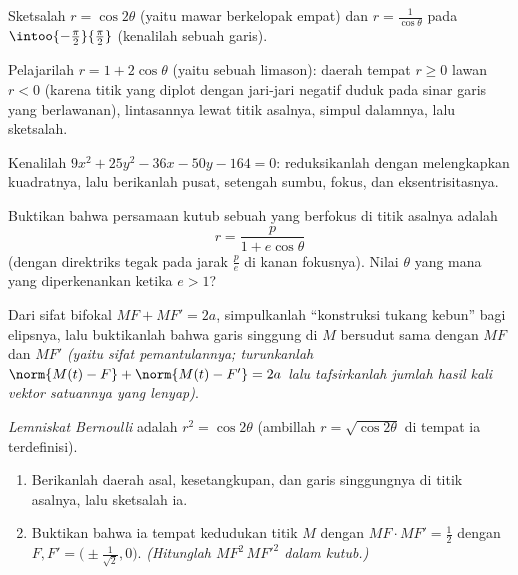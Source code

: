 \begin{exercise}[$\star$]\label{exo:b1:curves:4}
Sketsalah  $r = \cos 2\theta$ (yaitu mawar berkelopak empat) dan
$r = \frac{1}{\cos\theta}$ pada $\intoo{-\frac\pi2}{\frac\pi2}$
(kenalilah sebuah garis).
\end{exercise}

\begin{exercise}[$\star\star$]\label{exo:b1:curves:5}
Pelajarilah  $r = 1 + 2\cos\theta$ (yaitu sebuah limason): daerah
tempat $r \geq 0$ lawan $r < 0$ (karena titik yang diplot dengan jari-jari negatif
duduk pada sinar garis yang berlawanan), lintasannya lewat titik asalnya, simpul dalamnya,
lalu sketsalah.
\end{exercise}

\begin{exercise}[$\star\star$]\label{exo:b1:curves:6}
Kenalilah  $9x^2 + 25y^2 - 36x - 50y - 164 = 0$: reduksikanlah dengan
melengkapkan kuadratnya, lalu berikanlah pusat, setengah sumbu, fokus, dan eksentrisitasnya.
\end{exercise}

\begin{exercise}[$\star\star$]\label{exo:b1:curves:7}
Buktikan bahwa persamaan kutub sebuah  yang berfokus di titik asalnya
adalah
\[
r = \frac{p}{1 + e\cos\theta}
\]
(dengan direktriks tegak pada jarak $\frac pe$ di kanan fokusnya).
Nilai $\theta$ yang mana yang diperkenankan ketika $e > 1$?
\end{exercise}

\begin{exercise}[$\star\star$]\label{exo:b1:curves:8}
Dari sifat bifokal $MF + MF' = 2a$, simpulkanlah ``konstruksi
tukang kebun'' bagi elipsnya, lalu buktikanlah bahwa garis singgung di $M$
bersudut sama dengan $MF$ dan $MF'$ \emph{(yaitu sifat pemantulannya;
turunkanlah $\norm{M(t) - F} + \norm{M(t) - F'} = 2a$ lalu
tafsirkanlah jumlah hasil kali vektor satuannya yang lenyap)}.
\end{exercise}

\begin{exercise}[$\star\star\star$]\label{exo:b1:curves:9}
\emph{Lemniskat Bernoulli} adalah  $r^2 = \cos
2\theta$ (ambillah $r = \sqrt{\cos2\theta}$ di tempat ia terdefinisi).
\begin{enumerate}
  \item Berikanlah daerah asal, kesetangkupan, dan garis singgungnya di titik asalnya, lalu
        sketsalah ia.
  \item Buktikan bahwa ia tempat kedudukan titik $M$ dengan $MF \cdot MF'
        = \frac12$ dengan $F, F' = \bigl(\pm\frac{1}{\sqrt2},
        0\bigr)$. \emph{(Hitunglah $MF^2\,MF'^2$ dalam 
        kutub.)}
\end{enumerate}
\end{exercise}

